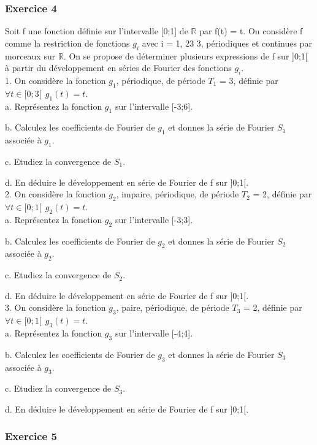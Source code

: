 	
	\subsubsection{Exercice 4}
	Soit f une fonction définie sur l'intervalle [0;1] de $\mathbb{R}$ par f(t) = t.
	On considère f comme la restriction de fonctions $g_i$ avec i = 1, 23 3, périodiques et continues par morceaux sur $\mathbb{R}$. On se propose de déterminer plusieurs expressions de f sur ]0;1[ à partir du développement en séries de Fourier des fonctions $g_i$.\\
	
	1. On considère la fonction $g_1$, périodique, de période $T_1$ = 3, définie par $\forall t \in [0;3[~~ g_1(t) = t$.\\
		a. Représentez la fonction $g_1$ sur l'intervalle [-3;6].
		
		b. Calculez les coefficients de Fourier de $g_1$ et donnes la série de Fourier $S_1$ associée à $g_1$.
		
		
		c. Etudiez la convergence de $S_1$.
		
		d. En déduire le développement en série de Fourier de f sur ]0;1[.\\
		
	2. On considère la fonction $g_2$, impaire, périodique, de période $T_2$ = 2, définie par $\forall t \in [0;1[~~ g_2(t) = t$.\\
		a. Représentez la fonction $g_2$ sur l'intervalle [-3;3].
		
		b. Calculez les coefficients de Fourier de $g_2$ et donnes la série de Fourier $S_2$ associée à $g_2$.
		
		c. Etudiez la convergence de $S_2$.
		
		d. En déduire le développement en série de Fourier de f sur ]0;1[.\\
	
	3. On considère la fonction $g_3$, paire, périodique, de période $T_3$ = 2, définie par $\forall t \in [0;1[~~ g_3(t) = t$.\\
		a. Représentez la fonction $g_3$ sur l'intervalle [-4;4].
	
		b. Calculez les coefficients de Fourier de $g_3$ et donnes la série de Fourier $S_3$ associée à $g_3$.
	
		c. Etudiez la convergence de $S_3$.
	
		d. En déduire le développement en série de Fourier de f sur ]0;1[.\\
	
	
	\subsubsection{Exercice 5}
	
